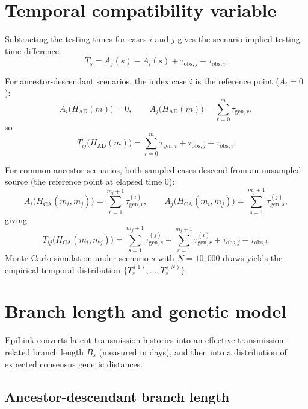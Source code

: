 \documentclass[11pt,a4paper]{article}
\begin{document}
\section{Temporal compatibility variable}\label{sec:S1_temporal}

Subtracting the testing times for cases $i$ and $j$ gives the scenario-implied testing-time difference
\[
	T_s = A_j(s) - A_i(s) + \tau_{\mathrm{obs},j} - \tau_{\mathrm{obs},i}.
\]

For ancestor-descendant scenarios, the index case $i$ is the reference point ($A_i = 0$):
\[
	A_i\!\bigl(H_{\mathrm{AD}}(m)\bigr) = 0, \qquad
	A_j\!\bigl(H_{\mathrm{AD}}(m)\bigr) = \sum_{r=0}^{m} \tau_{\mathrm{gen},r},
\]
so
\[
	T_{ij}\!\bigl(H_{\mathrm{AD}}(m)\bigr)
	= \sum_{r=0}^{m} \tau_{\mathrm{gen},r}
	+ \tau_{\mathrm{obs},j}
	- \tau_{\mathrm{obs},i}.
\]

For common-ancestor scenarios, both sampled cases descend from an unsampled source (the reference point at elapsed time 0):
\[
	A_i\!\bigl(H_{\mathrm{CA}}(m_i,m_j)\bigr)
	= \sum_{r=1}^{m_i+1} \tau_{\mathrm{gen},r}^{(i)}, \qquad
	A_j\!\bigl(H_{\mathrm{CA}}(m_i,m_j)\bigr)
	= \sum_{s=1}^{m_j+1} \tau_{\mathrm{gen},s}^{(j)},
\]
giving
\[
	T_{ij}\!\bigl(H_{\mathrm{CA}}(m_i,m_j)\bigr)
	= \sum_{s=1}^{m_j+1} \tau_{\mathrm{gen},s}^{(j)}
	- \sum_{r=1}^{m_i+1} \tau_{\mathrm{gen},r}^{(i)}
	+ \tau_{\mathrm{obs},j}
	- \tau_{\mathrm{obs},i}.
\]
Monte Carlo simulation under scenario $s$ with $N = 10{,}000$ draws yields the empirical temporal distribution $\{T_s^{(1)},\ldots,T_s^{(N)}\}$.

\section{Branch length and genetic model}\label{sec:S1_genetic}

EpiLink converts latent transmission histories into an effective transmission-related branch length $B_s$ (measured in days), and then into a distribution of expected consensus genetic distances.

\subsection{Ancestor-descendant branch length}\label{sec:S1_ad_branch}
\end{document}
